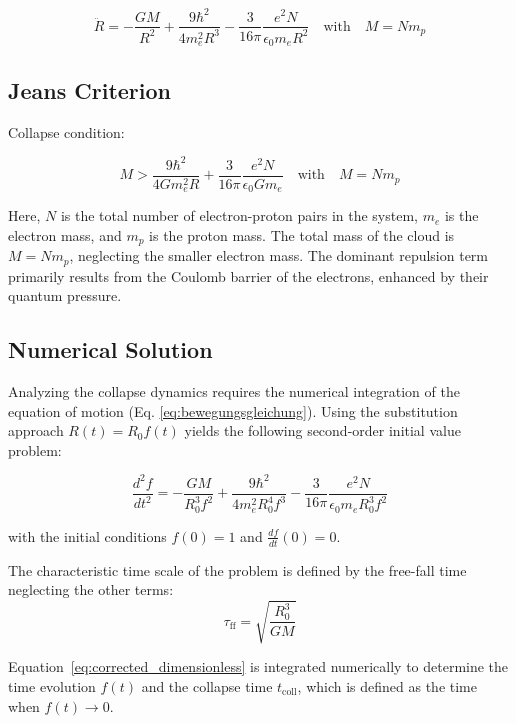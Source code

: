 \begin{equation}
    \label{eq:bewegungsgleichung}
    \ddot{R} = -\frac{G M}{R^2} + \frac{9 \hbar^2}{4 m_e^2 R^3} - \frac{3}{16\pi} \frac{e^2 N}{\epsilon_0 m_e R^2}
    \quad \text{with} \quad M = N m_p
\end{equation}

\subsection{Jeans Criterion}
Collapse condition:

\begin{equation}
    M > \frac{9 \hbar^2}{4 G m_e^2 R} + \frac{3}{16\pi} \frac{e^2 N}{\epsilon_0 G m_e}
    \quad \text{with} \quad M = N m_p
\end{equation}

Here, $N$ is the total number of electron-proton pairs in the system, $m_e$ is the electron mass, and $m_p$ is the proton mass. The total mass of the cloud is $M = N m_p$, neglecting the smaller electron mass. The dominant repulsion term primarily results from the Coulomb barrier of the electrons, enhanced by their quantum pressure.

\subsection{Numerical Solution}
Analyzing the collapse dynamics requires the numerical integration of the equation of motion (Eq. \ref{eq:bewegungsgleichung}). Using the substitution approach $R(t) = R_0 f(t)$ yields the following second-order initial value problem:

\begin{equation}
\label{eq:corrected_dimensionless}
\frac{d^{2}f}{dt^{2}} = -\frac{G M}{R_{0}^{3} f^{2}} + \frac{9 \hbar^{2}}{4 m_e^{2} R_{0}^{4} f^{3}} - \frac{3}{16\pi} \frac{e^{2} N}{\epsilon_{0} m_e R_{0}^{3} f^{2}}
\end{equation}

\noindent with the initial conditions $f(0) = 1$ and $\frac{df}{dt}(0) = 0$.

The characteristic time scale of the problem is defined by the free-fall time neglecting the other terms:
\[
\tau_{\text{ff}} = \sqrt{\frac{R_0^3}{G M}}
\]

Equation~\ref{eq:corrected_dimensionless} is integrated numerically to determine the time evolution $f(t)$ and the collapse time $t_{\text{coll}}$, which is defined as the time when $f(t) \rightarrow 0$.


